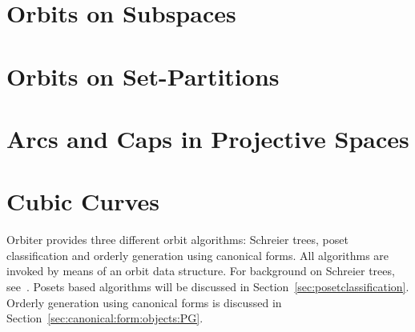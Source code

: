 \section{Orbits on Subspaces}
\label{sec:subspaceorbits}



\bigskip

\clearpage






\clearpage

\section{Orbits on Set-Partitions}
\label{sec:orbits:setpartition}



\bigskip

\clearpage







\section{Arcs and Caps in Projective Spaces}
\label{sec:arcs}



 
\bigskip
\clearpage


\section{Cubic Curves}
\label{sec:cubiccurves}




\bigskip

\clearpage

Orbiter provides three different orbit algorithms: Schreier trees, poset classification and orderly generation using canonical forms. 
All algorithms are invoked by means of an orbit data structure. 
For background on Schreier trees, see~\cite{Butler91,Holt05,Seress03}.
Posets based algorithms will be discussed in Section~\ref{sec:posetclassification}.
Orderly generation using canonical forms is discussed in Section~\ref{sec:canonical:form:objects:PG}.

\bigskip


